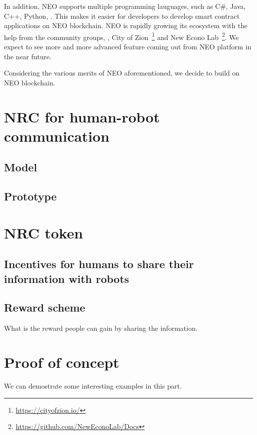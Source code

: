\documentclass{article}
\begin{document}
In addition, NEO supports multiple programming lauguages, such as C\#, Java,
C++, Python, \etc. This makes it easier for developers to develop
smart contract applications on NEO blockchain. 
NEO is rapidly growing its ecosystem with the help from the 
community groups, \eg, City of Zion~\footnote{\url{https://cityofzion.io/}} 
and New Econo Lab~\footnote{\url{https://github.com/NewEconoLab/Docs}}.
We expect to see more and more advanced feature coming out from NEO
platform in the near future.

Considering the various merits of NEO aforementioned, we decide to build
\nrc on NEO blockchain.


\section{NRC for human-robot communication}
\label{sec:nrc}

\subsection{Model}
\label{subsec:model}

\subsection{Prototype}
\label{subsec:prototype}


\section{NRC token}

\subsection{Incentives for humans to share their information 
    with robots}



\subsection{Reward scheme}
What is the reward people can gain by sharing the information.


\section{Proof of concept}
\label{sec:proof-concept}

We can demostrate some interesting examples in this part.
\end{document}
